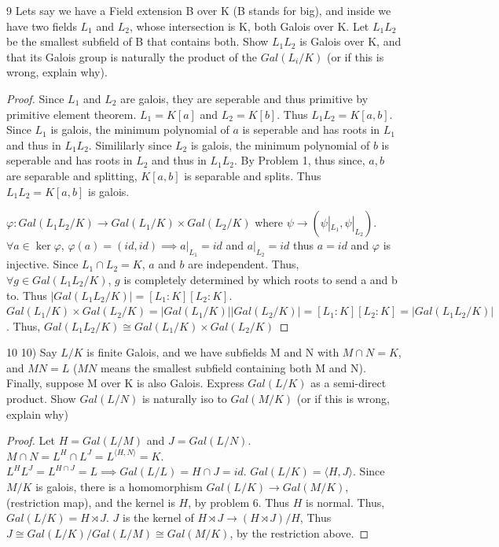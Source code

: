 \documentclass{article}
\newcommand{\angles}[1]{\langle #1 \rangle}
\begin{document}
\begin{PROB}{9}\label{Problem 9.}
    Lets say we have a Field extension B over K (B stands for big), and inside we have two fields $L_1$ and $L_2$, whose intersection is K, both Galois over K. Let $L_1 L_2$ be the smallest subfield of B that contains both. Show $L_1L_2$ is Galois over K, and that its Galois group is naturally the product of the $Gal(L_i/K)$  (or if this is wrong, explain why).  
\end{PROB}
\begin{proof}
    Since $L_1$ and $L_2$ are galois, they are seperable and thus primitive by primitive element theorem.  
    $L_1 = K[a]$ and $L_2 = K[b]$. Thus $L_1 L_2 = K[a, b]$. Since $L_1$ is galois, the minimum polynomial of $a$ is seperable and has roots in $L_1$ and thus in $L_1L_2$. Simililarly since $L_2$ is galois, the minimum polynomial of $b$ is seperable and has roots in $L_2$ and thus in $L_1L_2$. By Problem 1, thus since, $a, b$ are separable and splitting, $K[a, b]$ is separable and splits. Thus $L_1 L_2 = K[a, b]$ is galois.
    
    $\varphi : Gal(L_1L_2 / K) \to Gal(L_1 / K) \times Gal(L_2 / K)$ where $\psi \to (\psi|_{L_1}, \psi|_{L_2})$. $\forall a \in \ker \varphi$, $\varphi(a) = (id, id) \implies a|_{L_1} = id$ and $a|_{L_2} = id$ thus $a = id$ and $\varphi$ is injective. Since $L_1 \cap L_2 = K$, $a$ and $b$ are independent. Thus, $\forall g \in Gal(L_1L_2 / K)$, $g$ is completely determined by which roots to send a and b to. Thus $|Gal(L_1L_2 / K)|= [L_1 : K][L_2 : K]$. $Gal(L_1 / K) \times Gal(L_2 / K) = |Gal(L_1 / K)||Gal(L_2 / K)| =  [L_1 : K][L_2 : K] = |Gal(L_1L_2 / K)|$. Thus, $Gal(L_1L_2 / K) \cong Gal(L_1 / K) \times Gal(L_2 / K)$       
    
\end{proof}

\bigskip

\begin{PROB}{10}\label{Problem 10.}
    10) Say $L/K$ is finite Galois, and we have subfields M and N with $M \cap N = K$, and $MN = L$ ($MN$ means the smallest subfield containing both M and N). Finally, suppose M over K is also Galois.  Express $Gal(L/K)$ as a semi-direct product. Show $Gal(L/N)$ is naturally iso to $Gal(M/K)$ (or if this is wrong, explain why)
\end{PROB}
\begin{proof}
    Let $H = Gal(L / M)$ and $J = Gal(L / N)$. $M \cap N  = L^H \cap L^J = L^{\angles{H, N}} = K$. $L^H L^J = L^{H \cap J} = L \implies Gal(L / L) = H \cap J = { id }$. $Gal(L / K) = \angles{H, J}$. Since $M / K$ is galois, there is a homomorphism $Gal(L / K) \to Gal(M / K)$, (restriction map), and the kernel is $H$, by problem 6. Thus $H$ is normal. Thus, $Gal(L / K) = H \rtimes J$. $J$ is the kernel of $H \rtimes J \to (H \rtimes J) / H$, Thus $J \cong Gal(L / K) / Gal(L / M) \cong Gal(M / K)$, by the restriction above.                    
\end{proof}
\end{document}
